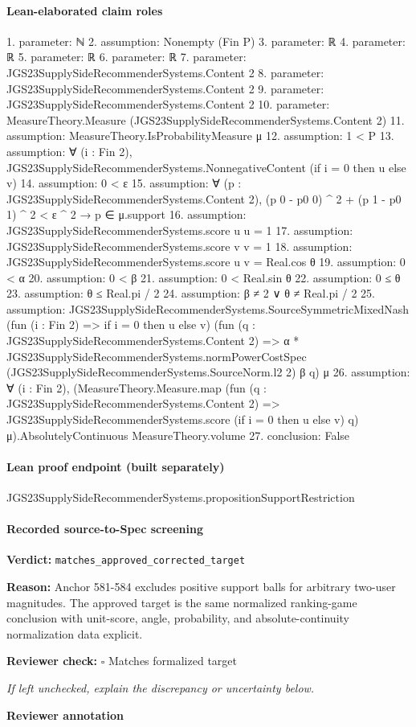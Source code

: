 \documentclass[10pt]{article}
\newcommand{\reviewerbox}{%
  \par\noindent\fbox{\parbox{0.96\linewidth}{\rule{0pt}{0.38in}}}\par
}
\newcommand{\reviewmatch}[1]{%
  \par\noindent\textbf{Reviewer check:} $\square$\; #1\par
  \noindent\emph{If left unchecked, explain the discrepancy or uncertainty below.}\par
}
\begin{document}
\paragraph{Lean-elaborated claim roles}\begin{ReviewVerbatim}
1. parameter: ℕ
2. assumption: Nonempty (Fin P)
3. parameter: ℝ
4. parameter: ℝ
5. parameter: ℝ
6. parameter: ℝ
7. parameter: JGS23SupplySideRecommenderSystems.Content 2
8. parameter: JGS23SupplySideRecommenderSystems.Content 2
9. parameter: JGS23SupplySideRecommenderSystems.Content 2
10. parameter: MeasureTheory.Measure (JGS23SupplySideRecommenderSystems.Content 2)
11. assumption: MeasureTheory.IsProbabilityMeasure μ
12. assumption: 1 < P
13. assumption: ∀ (i : Fin 2), JGS23SupplySideRecommenderSystems.NonnegativeContent (if i = 0 then u else v)
14. assumption: 0 < ε
15. assumption: ∀ (p : JGS23SupplySideRecommenderSystems.Content 2), (p 0 - p0 0) ^ 2 + (p 1 - p0 1) ^ 2 < ε ^ 2 → p ∈ μ.support
16. assumption: JGS23SupplySideRecommenderSystems.score u u = 1
17. assumption: JGS23SupplySideRecommenderSystems.score v v = 1
18. assumption: JGS23SupplySideRecommenderSystems.score u v = Real.cos θ
19. assumption: 0 < α
20. assumption: 0 < β
21. assumption: 0 < Real.sin θ
22. assumption: 0 ≤ θ
23. assumption: θ ≤ Real.pi / 2
24. assumption: β ≠ 2 ∨ θ ≠ Real.pi / 2
25. assumption: JGS23SupplySideRecommenderSystems.SourceSymmetricMixedNash (fun (i : Fin 2) => if i = 0 then u else v)
  (fun (q : JGS23SupplySideRecommenderSystems.Content 2) =>
    α * JGS23SupplySideRecommenderSystems.normPowerCostSpec (JGS23SupplySideRecommenderSystems.SourceNorm.l2 2) β q)
  μ
26. assumption: ∀ (i : Fin 2),
  (MeasureTheory.Measure.map
        (fun (q : JGS23SupplySideRecommenderSystems.Content 2) =>
          JGS23SupplySideRecommenderSystems.score (if i = 0 then u else v) q)
        μ).AbsolutelyContinuous
    MeasureTheory.volume
27. conclusion: False
\end{ReviewVerbatim}

\paragraph{Lean proof endpoint (built separately)}\begin{ReviewVerbatim}
JGS23SupplySideRecommenderSystems.propositionSupportRestriction
\end{ReviewVerbatim}

\paragraph{Recorded source-to-Spec screening}
\textbf{Verdict:} \texttt{matches\_approved\_corrected\_target}
\\
{\raggedright
\textbf{Reason:} Anchor 581-\allowbreak{}584 excludes positive support balls for arbitrary two-\allowbreak{}user magnitudes.\allowbreak{}  The approved target is the same normalized ranking-\allowbreak{}game conclusion with unit-\allowbreak{}score, angle, probability, and absolute-\allowbreak{}continuity normalization data explicit.\allowbreak{}
\par}
\reviewmatch{Matches formalized target}
\noindent\textbf{Reviewer annotation}\par
\reviewerbox
\clearpage
\hypertarget{source-claim-b014d48b1f280b37}{}
\end{document}

